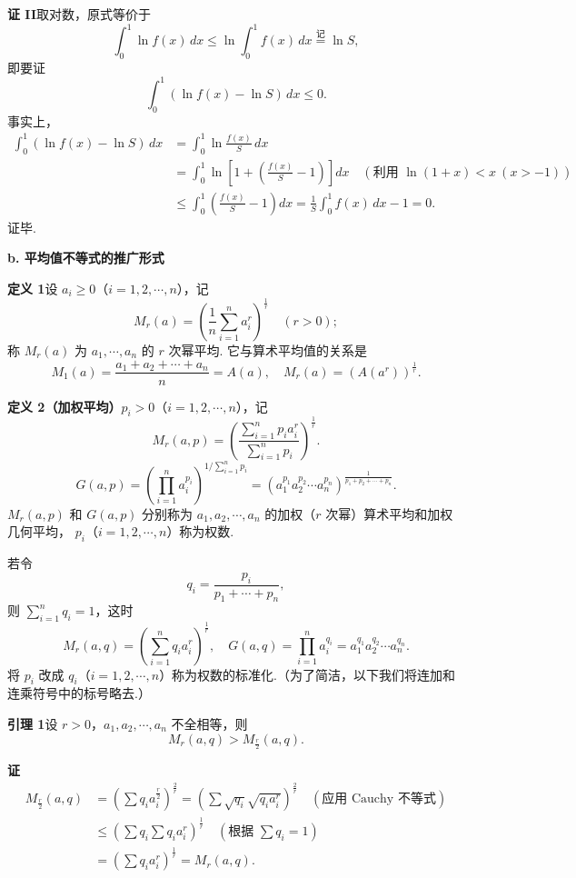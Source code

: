 \documentclass[UTF8, 12pt, fontset=fandol, oneside]{ctexart}
\begin{document}
\noindent\textbf{证 II}\quad 取对数，原式等价于
\[
\int_0^1\ln f(x)\,dx\le\ln\int_0^1 f(x)\,dx\stackrel{\text{记}}{=}\ln S,
\]
即要证
\[
\int_0^1(\ln f(x)-\ln S)\,dx\le0.
\]
事实上，
\[
\begin{aligned}
\int_0^1(\ln f(x)-\ln S)\,dx
&=\int_0^1\ln\frac{f(x)}S\,dx\\
&=\int_0^1\ln\left[1+\left(\frac{f(x)}S-1\right)\right]dx
\quad(\text{利用 }\ln(1+x)<x\ (x>-1))\\
&\le\int_0^1\left(\frac{f(x)}S-1\right)dx
=\frac1S\int_0^1 f(x)\,dx-1=0.
\end{aligned}
\]
证毕.

\noindent\textbf{b. 平均值不等式的推广形式}

\noindent\textbf{定义 1}\quad 设 $a_i\ge0$（$i=1,2,\cdots,n$），记
\[
M_r(a)=\left(\frac1n\sum_{i=1}^n a_i^r\right)^{\frac1r}\quad(r>0);
\]
称 $M_r(a)$ 为 $a_1,\cdots,a_n$ 的 $r$ 次幂平均. 它与算术平均值的关系是
\[
M_1(a)=\frac{a_1+a_2+\cdots+a_n}{n}=A(a),\quad
M_r(a)=(A(a^r))^{\frac1r}.
\]

\noindent\textbf{定义 2（加权平均）}\quad $p_i>0$（$i=1,2,\cdots,n$），记
\[
M_r(a,p)=\left(\frac{\sum_{i=1}^n p_i a_i^r}{\sum_{i=1}^n p_i}\right)^{\frac1r}.
\]
\[
G(a,p)=\left(\prod_{i=1}^n a_i^{p_i}\right)^{1/\sum_{i=1}^n p_i}
=(a_1^{p_1}a_2^{p_2}\cdots a_n^{p_n})^{\frac1{p_1+p_2+\cdots+p_n}}.
\]
$M_r(a,p)$ 和 $G(a,p)$ 分别称为 $a_1,a_2,\cdots,a_n$ 的加权（$r$ 次幂）算术平均和加权几何平均，
$p_i$（$i=1,2,\cdots,n$）称为权数.

若令
\[
q_i=\frac{p_i}{p_1+\cdots+p_n},
\]
则 $\sum_{i=1}^n q_i=1$，这时
\[
M_r(a,q)=\left(\sum_{i=1}^n q_i a_i^r\right)^{\frac1r},\quad
G(a,q)=\prod_{i=1}^n a_i^{q_i}=a_1^{q_1}a_2^{q_2}\cdots a_n^{q_n}.
\]
将 $p_i$ 改成 $q_i$（$i=1,2,\cdots,n$）称为权数的标准化.（为了简洁，以下我们将连加和连乘符号中的标号略去.）

\noindent\textbf{引理 1}\quad 设 $r>0$，$a_1,a_2,\cdots,a_n$ 不全相等，则
\[
M_r(a,q)>M_{\frac r2}(a,q).
\]

\noindent\textbf{证}\quad
\[
\begin{aligned}
M_{\frac r2}(a,q)
&=\left(\sum q_i a_i^{\frac r2}\right)^{\frac2r}
=\left(\sum \sqrt{q_i}\sqrt{q_i a_i^r}\right)^{\frac2r}\quad(\text{应用 Cauchy 不等式})\\
&\le\left(\sum q_i\sum q_i a_i^r\right)^{\frac1r}\quad(\text{根据 }\sum q_i=1)\\
&=\left(\sum q_i a_i^r\right)^{\frac1r}=M_r(a,q).
\end{aligned}
\]
\end{document}
